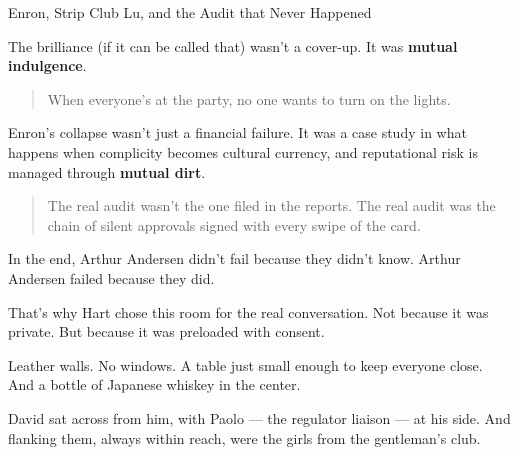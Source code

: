 \begin{HistoricalSidebar}{Enron, Strip Club Lu, and the Audit that Never Happened}
  \medskip
  
  The brilliance (if it can be called that) wasn’t a cover-up. It was \textbf{mutual indulgence}.  
  
  \begin{quote}
  When everyone’s at the party, no one wants to turn on the lights.
  \end{quote}
  
  Enron’s collapse wasn’t just a financial failure. It was a case study in what happens when complicity becomes 
  cultural currency, and reputational risk is managed through \textbf{mutual dirt}.  
  
  \begin{quote}
  The real audit wasn’t the one filed in the reports.  
  The real audit was the chain of silent approvals signed with every swipe of the card.
  \end{quote}
  
  In the end, Arthur Andersen didn’t fail because they didn’t know.  Arthur Andersen failed because they did.
  
\end{HistoricalSidebar}

\medskip

That’s why Hart chose this room for the real conversation.  
Not because it was private.  
But because it was preloaded with consent.

Leather walls. No windows. A table just small enough to keep everyone close.  
And a bottle of Japanese whiskey in the center.

David sat across from him, with Paolo — the regulator liaison — at his side.  
And flanking them, always within reach, were the girls from the gentleman's club.

\medskip

